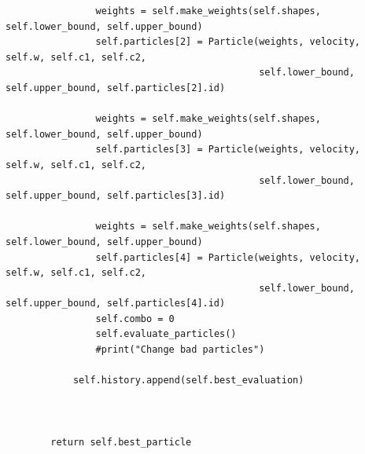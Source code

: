 \documentclass[a4paper]{article}
\begin{document}
\begin{lstlisting}
                weights = self.make_weights(self.shapes, self.lower_bound, self.upper_bound)
                self.particles[2] = Particle(weights, velocity, self.w, self.c1, self.c2, 
                                             self.lower_bound, self.upper_bound, self.particles[2].id)
                
                weights = self.make_weights(self.shapes, self.lower_bound, self.upper_bound)
                self.particles[3] = Particle(weights, velocity, self.w, self.c1, self.c2, 
                                             self.lower_bound, self.upper_bound, self.particles[3].id)
                
                weights = self.make_weights(self.shapes, self.lower_bound, self.upper_bound)
                self.particles[4] = Particle(weights, velocity, self.w, self.c1, self.c2, 
                                             self.lower_bound, self.upper_bound, self.particles[4].id)
                self.combo = 0
                self.evaluate_particles()
                #print("Change bad particles")
            
            self.history.append(self.best_evaluation)   
                
                
            
        return self.best_particle

\end{lstlisting}
\end{document}
